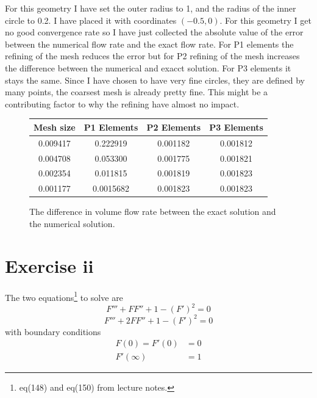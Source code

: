 \documentclass[11pt]{report}
\begin{document}
For this geometry I have set the outer radius to 1, and the radius of the inner circle to 0.2. I have placed it with coordinates $(-0.5, 0)$. For this geometry I get no good convergence rate so I have just collected the absolute value of the error between the numerical flow rate and the exact flow rate. For P1 elements the refining of the mesh reduces the error but for P2 refining of the mesh increases the difference between the numerical and exacct solution. For P3 elements it stays the same. Since I have chosen to have very fine circles, they are defined by many points, the coarsest mesh is already pretty fine. This might be a contributing factor to why the refining have almost no impact.

\begin{figure}[htb]
\begin{center}
\begin{tabular}{|c|c|c|c|}
\hline
Mesh size & P1 Elements & P2 Elements & P3 Elements \\ \hline
0.009417 & 0.222919  & 0.001182 & 0.001812         \\ \hline
0.004708 & 0.053300 & 0.001775 & 0.001821           \\ \hline
0.002354 & 0.011815 & 0.001819 & 0.001823           \\ \hline
0.001177 & 0.0015682 & 0.001823 & 0.001823           \\ \hline
\end{tabular}
\end {center}
\caption{The difference in volume flow rate between the exact solution and the numerical solution.}
\end{figure}

\chapter*{Exercise ii}

The two equations\footnote{eq(148) and eq(150) from lecture notes.} to solve are \begin{equation} F''' + FF'' + 1 - (F')^2 = 0 \end{equation}
\begin{equation} F''' + 2FF'' + 1 - (F')^2 = 0 \end{equation}
with boundary conditions
\begin{equation}\begin{split} F(0) = F'(0) &= 0 \\ F'(\infty) &= 1 \end{split}\end{equation} 
\end{document}

